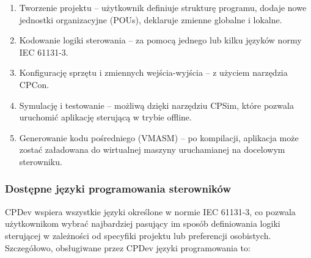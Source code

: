 \documentclass[12pt,twoside]{article}
\begin{document}
\begin{enumerate}[label=\arabic*), leftmargin=1.25cm]
    \item Tworzenie projektu -- użytkownik definiuje strukturę programu, dodaje nowe jednostki organizacyjne (POUs), deklaruje zmienne globalne i lokalne.
    \item Kodowanie logiki sterowania -- za pomocą jednego lub kilku języków normy IEC 61131-3.
    \item Konfigurację sprzętu i zmiennych wejścia-wyjścia -- z użyciem narzędzia CPCon.
    \item Symulację i testowanie -- możliwą dzięki narzędziu CPSim, które pozwala uruchomić aplikację sterującą w trybie offline.
    \item Generowanie kodu pośredniego (VMASM) -- po kompilacji, aplikacja może zostać załadowana do wirtualnej maszyny uruchamianej na docelowym sterowniku.
\end{enumerate}

\subsubsection{Dostępne języki programowania sterowników}
CPDev wspiera wszystkie języki określone w normie IEC 61131-3\cite{iec61131-3}\cite{cpdevLanguages}, co pozwala użytkownikom wybrać najbardziej pasujący im sposób definiowania logiki sterującej w zależności od specyfiki projektu lub preferencji osobistych. Szczegółowo, obsługiwane przez CPDev języki programowania to:
\end{document}
